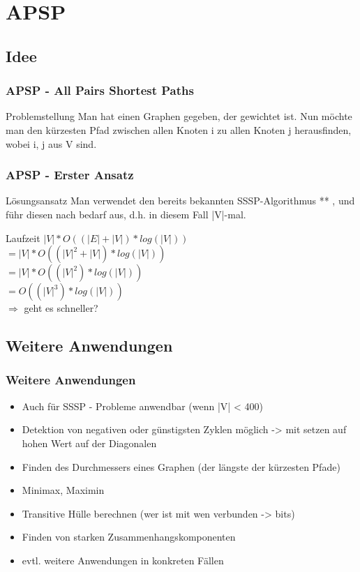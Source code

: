 \section{APSP} 

\subsection{Idee} 

\begin{frame}
\frametitle{APSP - All Pairs Shortest Paths}
\begin{block}{Problemstellung}
Man hat einen Graphen gegeben, der gewichtet ist. Nun möchte man den kürzesten Pfad zwischen allen Knoten i zu allen Knoten j herausfinden, wobei i, j aus V sind.
\end{block}
\end{frame}


\begin{frame}
\frametitle{APSP - Erster Ansatz}
\begin{block}{Lösungsansatz}
Man verwendet den bereits bekannten SSSP-Algorithmus ** , und führ diesen nach bedarf aus, d.h. in diesem Fall |V|-mal.
\end{block}

\begin{block}{Laufzeit}
$|V| * O ((|E| + |V|) * log(|V|))$\\$
= |V| * O ((|V|^2 + |V|) * log(|V|))$\\$
= |V| * O ((|V|^2) * log(|V|)) $\\$
= O ((|V|^3) * log(|V|))$\\
$\Rightarrow$ geht es schneller?
\end{block}
\end{frame}


\subsection{Weitere Anwendungen} 

\begin{frame}
\frametitle{Weitere Anwendungen}
\begin{itemize}

\item Auch für SSSP - Probleme anwendbar (wenn |V| < 400)
\item Detektion von negativen oder günstigsten Zyklen möglich -> mit setzen auf hohen Wert auf der Diagonalen
\item Finden des Durchmessers eines Graphen (der längste der kürzesten Pfade)
\item Minimax, Maximin
\item Transitive Hülle berechnen (wer ist mit wen verbunden -> bits)
\item Finden von starken Zusammenhangskomponenten
\item evtl. weitere Anwendungen in konkreten Fällen
\end{itemize}
\end{frame}

